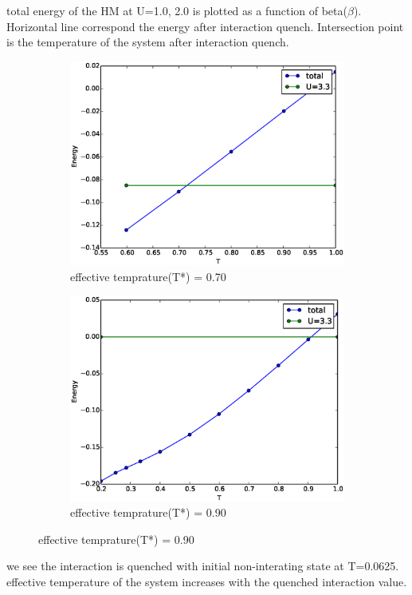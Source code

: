total energy of the HM at U=1.0, 2.0 is plotted as a function of beta($\beta$). Horizontal line correspond the energy after interaction quench. Intersection point is the temperature  of the system after interaction quench. 

\begin{figure}[H]
\begin{subfigure}{.5\textwidth}
 \includegraphics[width=1.1\linewidth]{bench_marking/total_energy_vs_beta_U3.eps}
  \caption{effective temprature(T*) = 0.70}
\end{subfigure}%
\begin{subfigure}{.5\textwidth}
  \includegraphics[width=1.1\linewidth]{bench_marking/total_energy_vs_beta_U33.eps}
  \caption{effective temprature(T*) = 0.90}
\end{subfigure}
\end{figure}

we see the interaction is quenched with initial non-interating state at T=0.0625. effective temperature of the system increases with the quenched interaction value.
